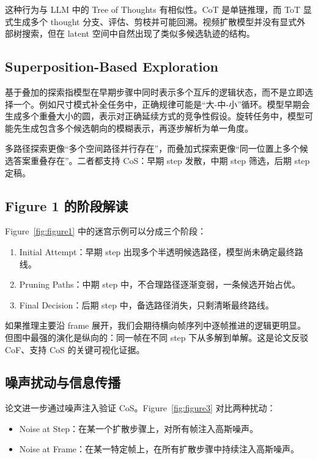 这种行为与 LLM 中的 Tree of Thoughts 有相似性。CoT 是单链推理，而 ToT 显式生成多个 thought 分支、评估、剪枝并可能回溯。视频扩散模型并没有显式外部树搜索，但在 latent 空间中自然出现了类似多候选轨迹的结构。

\subsection{Superposition-Based Exploration}

基于叠加的探索指模型在早期步骤中同时表示多个互斥的逻辑状态，而不是立即选择一个。例如尺寸模式补全任务中，正确规律可能是“大-中-小”循环。模型早期会生成多个重叠大小的圆，表示对正确延续方式的竞争性假设。旋转任务中，模型可能先生成包含多个候选朝向的模糊表示，再逐步解析为单一角度。

多路径探索更像“多个空间路径并行存在”，而叠加式探索更像“同一位置上多个候选答案重叠存在”。二者都支持 CoS：早期 step 发散，中期 step 筛选，后期 step 定稿。

\subsection{Figure 1 的阶段解读}

Figure~\ref{fig:figure1} 中的迷宫示例可以分成三个阶段：

\begin{enumerate}
    \item Initial Attempt：早期 step 出现多个半透明候选路径，模型尚未确定最终路线。
    \item Pruning Paths：中期 step 中，不合理路径逐渐变弱，一条候选开始占优。
    \item Final Decision：后期 step 中，备选路径消失，只剩清晰最终路线。
\end{enumerate}

如果推理主要沿 frame 展开，我们会期待横向帧序列中逐帧推进的逻辑更明显。但图中最强的演化是纵向的：同一帧在不同 step 下从多解到单解。这是论文反驳 CoF、支持 CoS 的关键可视化证据。

\subsection{噪声扰动与信息传播}

论文进一步通过噪声注入验证 CoS。Figure~\ref{fig:figure3} 对比两种扰动：

\begin{itemize}
    \item Noise at Step：在某一个扩散步骤上，对所有帧注入高斯噪声。
    \item Noise at Frame：在某一特定帧上，在所有扩散步骤中持续注入高斯噪声。
\end{itemize}


